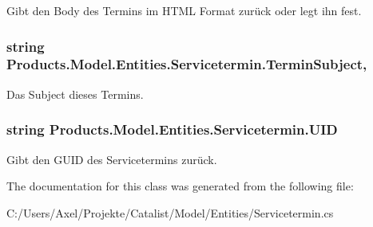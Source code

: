 Gibt den Body des Termins im H\+T\+ML Format zurück oder legt ihn fest. 

\subsubsection[{\texorpdfstring{Termin\+Subject}{TerminSubject}}]{\setlength{\rightskip}{0pt plus 5cm}string Products.\+Model.\+Entities.\+Servicetermin.\+Termin\+Subject\hspace{0.3cm}{\ttfamily [get]}, {\ttfamily [set]}}\hypertarget{class_products_1_1_model_1_1_entities_1_1_servicetermin_a2a41b89c6bbf202e2159dd17137ff6c1}{}\label{class_products_1_1_model_1_1_entities_1_1_servicetermin_a2a41b89c6bbf202e2159dd17137ff6c1}


Das Subject dieses Termins. 

\subsubsection[{\texorpdfstring{U\+ID}{UID}}]{\setlength{\rightskip}{0pt plus 5cm}string Products.\+Model.\+Entities.\+Servicetermin.\+U\+ID\hspace{0.3cm}{\ttfamily [get]}}\hypertarget{class_products_1_1_model_1_1_entities_1_1_servicetermin_afbee7719f5a0701e0ffa84b840273aa5}{}\label{class_products_1_1_model_1_1_entities_1_1_servicetermin_afbee7719f5a0701e0ffa84b840273aa5}


Gibt den G\+U\+ID des Servicetermins zurück. 



The documentation for this class was generated from the following file\+:\begin{DoxyCompactItemize}
\item 
C\+:/\+Users/\+Axel/\+Projekte/\+Catalist/\+Model/\+Entities/Servicetermin.\+cs\end{DoxyCompactItemize}
